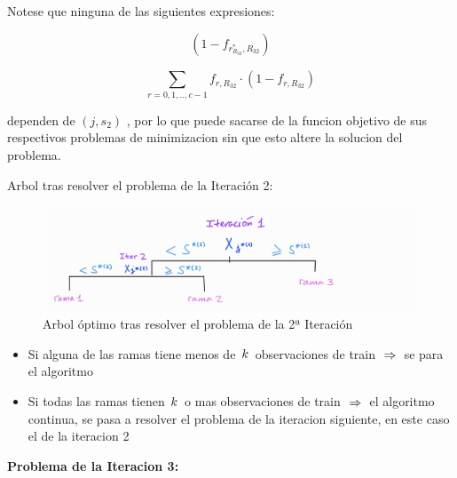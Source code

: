 \documentclass[
  11pt,
  a4paper,
]{article}
\begin{document}
\vspace{0.35cm}

Notese que ninguna de las siguientes expresiones:

\[\left( 1 - f_{r^*_{R_{32}} , R_{32}} \right)\]

\[\sum_{r=0,1,..,c-1}^{} f_{r , R_{32}}\cdot(1 - f_{r , R_{32}})\]

dependen de \((j, s_2)\) , por lo que puede sacarse de la funcion
objetivo de sus respectivos problemas de minimizacion sin que esto
altere la solucion del problema.

\vspace{0.35cm}

Arbol tras resolver el problema de la Iteración 2:

\begin{figure}
\centering
\includegraphics{output_523_0.jpg}
\caption{Arbol óptimo tras resolver el problema de la 2ª Iteración}
\end{figure}

\begin{itemize}
\item
  Si alguna de las ramas tiene menos de
  \(\hspace{0.05cm}k\hspace{0.05cm}\) observaciones de train
  \(\hspace{0.1cm} \Rightarrow \hspace{0.1cm}\) se para el algoritmo
\item
  Si todas las ramas tienen \(\hspace{0.05cm}k\hspace{0.05cm}\) o mas
  observaciones de train \(\hspace{0.1cm} \Rightarrow \hspace{0.1cm}\)
  el algoritmo continua, se pasa a resolver el problema de la iteracion
  siguiente, en este caso el de la iteracion 2
\end{itemize}

\vspace{0.35cm}

\textbf{Problema de la Iteracion 3:}
\end{document}

